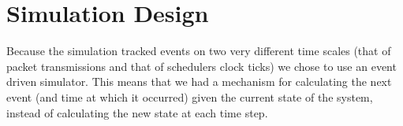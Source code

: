 \documentclass{IEEEtran}%
\begin{document}

\label{bib}
{}
 
 \newpage
  \appendices 
 \section{Simulation Design} \label{code_design}
 
 Because the simulation tracked events on two very different time scales (that of packet transmissions and that of schedulers clock ticks) we chose to use an event driven simulator.  This means that we had a mechanism for calculating the next event (and time at which it occurred) given the current state of the system, instead of calculating the new state at each time step.
 
\end{document}
